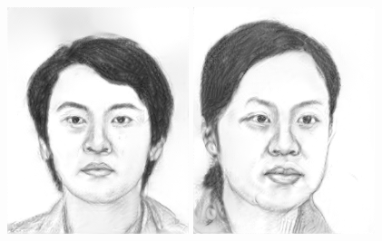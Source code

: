 \documentclass[10pt,twocolumn,letterpaper]{article}
\begin{document}
\begin{figure}[htbp]
{\begin{minipage}[b]{0.22\linewidth}
\includegraphics[width=0.99\linewidth]{img/light&pose_invariance/ours_l2.png}
\includegraphics[width=0.99\linewidth]{img/light&pose_invariance/ours_p1.png}

\end{minipage}}
\end{figure}
\end{document}
